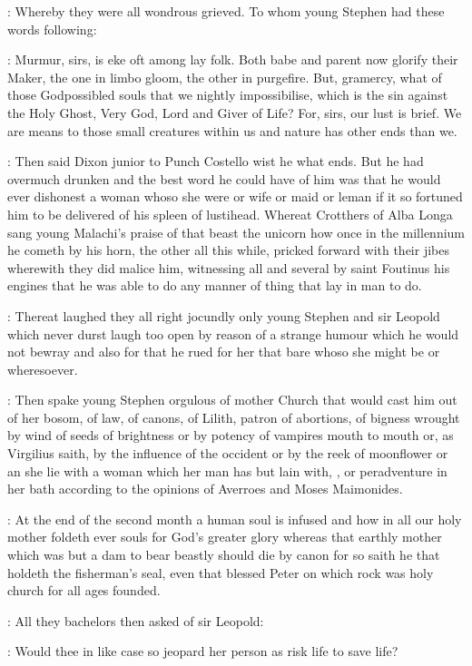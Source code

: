 :
Whereby they were all wondrous grieved.
To whom young Stephen had these words following:

\stephen:
Murmur,
sirs,
is eke oft among lay folk.
Both babe and parent now
glorify their Maker,
the one in limbo gloom,
the other in purgefire.
But,
gramercy,
what of those Godpossibled souls that we nightly impossibilise,
which is the sin against the Holy Ghost,
Very God,
Lord and Giver of Life?
For,
sirs,
our lust is brief.
We are means to those small creatures within
us and nature has other ends than we.

:
Then said Dixon junior to Punch Costello wist he what ends.
But he had overmuch drunken and the best word he could have of him was
that he would ever dishonest a woman whoso she were or wife or maid or
leman if it so fortuned him to be delivered of his spleen of lustihead.
Whereat Crotthers of Alba Longa sang young Malachi's praise of that beast
the unicorn how once in the millennium he cometh by his horn,
the other
all this while,
pricked forward with their jibes wherewith they did malice
him,
witnessing all and several by saint Foutinus his engines that he was
able to do any manner of thing that lay in man to do.

:
Thereat laughed they all right jocundly only young Stephen
and sir Leopold which never durst laugh too open by reason of a strange
humour which he would not bewray and also for that he rued for her that
bare whoso she might be or wheresoever.

:
Then spake young Stephen orgulous of mother Church that would cast
him out of her bosom,
of law,
of canons,
of Lilith,
patron of abortions,
of bigness wrought by wind of seeds of brightness or by potency of
vampires mouth to mouth or,
as Virgilius saith,
by the influence of the
occident or by the reek of moonflower or an she lie with a woman which her
man has but lain with,
,
or peradventure in her bath
according to the opinions of Averroes and Moses Maimonides.

\stephen:
At the end of the second month a human soul is infused and how in all
our holy mother foldeth ever souls for God's greater glory whereas that
earthly mother which was but a dam to bear beastly should die by canon for
so saith he that holdeth the fisherman's seal,
even that blessed Peter on
which rock was holy church for all ages founded.

:
All they bachelors then asked of sir Leopold:

\All:
Would thee in like case so jeopard her person as risk life to save
life?

